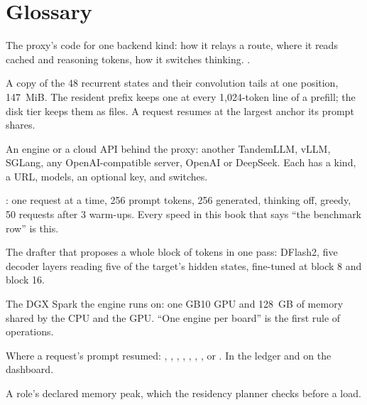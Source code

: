 \chapter{Glossary}\label{ch:glossary}

\begin{description}[style=unboxed, leftmargin=0pt, itemsep=.5ex, font=\normalfont\bfseries]

\item[adapter] The proxy's code for one backend kind: how it relays a route, where it reads cached and reasoning tokens, how it switches thinking. .

\item[anchor] A copy of the 48 recurrent states and their convolution tails at one position, 147~MiB. The resident prefix keeps one at every 1,024-token line of a prefill; the disk tier keeps them as files. A request resumes at the largest anchor its prompt shares.

\item[backend] An engine or a cloud API behind the proxy: another TandemLLM, vLLM, SGLang, any OpenAI-compatible server, OpenAI or DeepSeek. Each has a kind, a URL, models, an optional key, and switches.

\item[benchmark row] : one request at a time, 256 prompt tokens, 256 generated, thinking off, greedy, 50 requests after 3 warm-ups. Every speed in this book that says \enquote{the benchmark row} is this.

\item[block drafter] The drafter that proposes a whole block of tokens in one pass: DFlash2, five decoder layers reading five of the target's hidden states, fine-tuned at block 8 and block 16.

\item[board] The DGX Spark the engine runs on: one GB10 GPU and 128~GB of memory shared by the CPU and the GPU. \enquote{One engine per board} is the first rule of operations.

\item[cache source] Where a request's prompt resumed: , , , , , , ,  or . In the ledger and on the dashboard.

\item[claim] A role's declared memory peak, which the residency planner checks before a load.


\end{description}
